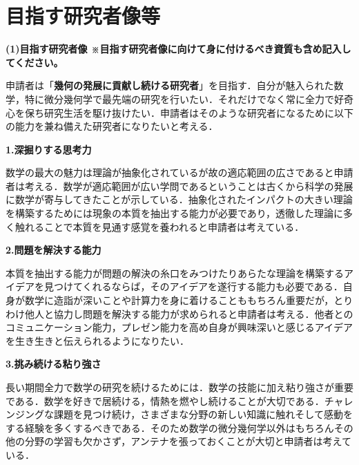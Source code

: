 \documentclass[11pt,a4j,dvipdfmx]{jarticle} 					%
\newcommand{\研究課題名}{象の卵}
\newcommand{\研究機関名}{京都大学}
\newcommand{\研究代表者氏名}{福士謙二}
\begin{document}




\section{目指す研究者像等}

\noindent
\textbf{(1)目指す研究者像 {\footnotesize ※目指す研究者像に向けて身に付けるべき資質も含め記入してください。}}

申請者は「\textbf{幾何の発展に貢献し続ける研究者}」を目指す．自分が魅入られた数学，特に微分幾何学で最先端の研究を行いたい．それだけでなく常に全力で好奇心を保ち研究生活を駆け抜けたい．申請者はそのような研究者になるために以下の能力を兼ね備えた研究者になりたいと考える．


\noindent
\textbf{1.深掘りする思考力}

数学の最大の魅力は理論が抽象化されているが故の適応範囲の広さであると申請者は考える．数学が適応範囲が広い学問であるということは古くから科学の発展に数学が寄与してきたことが示している．抽象化されたインパクトの大きい理論を構築するためには現象の本質を抽出する能力が必要であり，透徹した理論に多く触れることで本質を見通す感覚を養われると申請者は考えている．


\noindent
\textbf{2.問題を解決する能力}

本質を抽出する能力が問題の解決の糸口をみつけたりあらたな理論を構築するアイデアを見つけてくれるならば，そのアイデアを遂行する能力も必要である．自身が数学に造詣が深いことや計算力を身に着けることももちろん重要だが，とりわけ他人と協力し問題を解決する能力が求められると申請者は考える．他者とのコミュニケーション能力，プレゼン能力を高め自身が興味深いと感じるアイデアを生き生きと伝えられるようになりたい．


\noindent
\textbf{3.挑み続ける粘り強さ}

長い期間全力で数学の研究を続けるためには．数学の技能に加え粘り強さが重要である．数学を好きで居続ける，情熱を燃やし続けることが大切である．チャレンジングな課題を見つけ続け，さまざまな分野の新しい知識に触れそして感動をする経験を多くするべきである．そのため数学の微分幾何学以外はもちろんその他の分野の学習も欠かさず，アンテナを張っておくことが大切と申請者は考えている．

\end{document}
